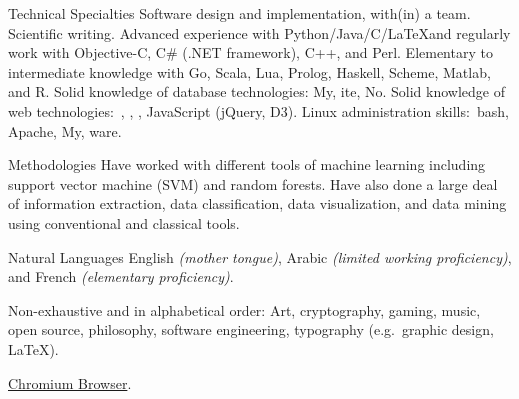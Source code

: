 \documentclass[10pt,a4paper]{article}
\begin{document}
\spacedhrule{0.5em}{-0.4em} %



\inlineheadsection
{Technical Specialties}
{Software design and implementation, with(in) a team. Scientific writing. Advanced experience with Python/Java/C/\LaTeX and regularly work with Objective-C, C\# (.NET framework), C++, and Perl. Elementary to intermediate knowledge with Go, Scala, Lua, Prolog, Haskell, Scheme, Matlab, and R. Solid knowledge of database technologies: My, ite, No. Solid knowledge of web technologies:\ , , , JavaScript (jQuery, D3). Linux administration skills:\ bash, Apache, My, ware.}

\inlineheadsection 
{Methodologies}
{Have worked with different tools of machine learning including support vector machine (SVM) and random forests. Have also done a large deal of information extraction, data classification, data visualization, and data mining using conventional and classical tools.}

\inlineheadsection 
{Natural Languages}
{English \textit{(mother tongue)}, Arabic \textit{(limited working proficiency)}, and French \textit{(elementary proficiency)}.}


\spacedhrule{1.6em}{-0.4em} %



\inlineheadsection %
{Non-exhaustive and in alphabetical order:}
{Art, cryptography, gaming, music, open source, philosophy, software engineering, typography (e.g.\ graphic design, \LaTeX).}


\spacedhrule{1.6em}{-0.4em} %



{\href{http://www.chromium.org}{Chromium Browser}.}

\end{document}
